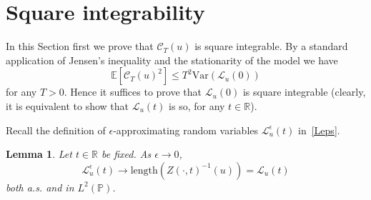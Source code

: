 \documentclass[10pt]{amsart}
\newtheorem{lemm}[theo]{Lemma}\newtheorem{prop}[theo]{Proposition}\newtheorem{coro}[theo]{Corollary}\newtheorem{conj}[theo]{Conjecture}
\theoremstyle{definition}\newtheorem{defi}[theo]{Definition}\newtheorem{rema}[theo]{Remark}\newtheorem{exam}[theo]{Example}\newtheorem{exem}[theo]{Example}\newtheorem{nota}[theo]{Notation}
\newcommand{\clC}{\mathcal{C}}
\newcommand{\clL}{\mathcal{L}}
\newcommand{\bbR}{\mathbb{R}}
\newcommand{\bbP}{\mathbb{P}}
\newcommand{\bbE}{\mathbb{E}}
\newcommand{\rVar}{\mathrm{Var}}
\begin{document}
\section{Square integrability}
\label{app-square}

In this Section first we prove that $\clC_T(u)$ is square integrable. By a standard application of Jensen's inequality and the stationarity of the model we have
\begin{equation}
\bbE\left[\clC_T(u)^2\right] \le T^2 \rVar(\clL_u(0))
\end{equation}
for any $T>0$. Hence it suffices to prove that $\clL_u(0)$ is square integrable (clearly, it is equivalent to show that $\clL_u(t)$ is so, for any $t\in\bbR$).

Recall the definition of $\epsilon$-approximating random variables $\clL_u^\epsilon(t)$ in~\eqref{Leps}.

\begin{lemm}\label{approx2}
Let $t\in \bbR$ be fixed. As $\epsilon\to 0$,
\begin{equation}\label{convergence}
\clL_u^\epsilon(t) \to \text{length}\left(Z(\cdot, t)^{-1}(u)\right)=\clL _u(t)
\end{equation}
both a.s. and in $L^2(\bbP)$.
\end{lemm}
\end{document}
